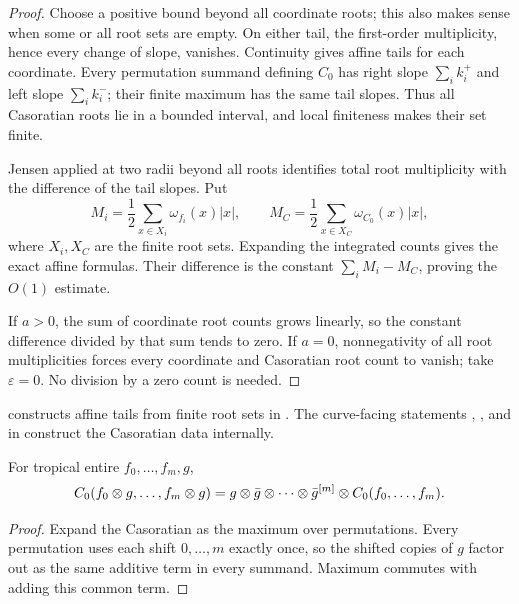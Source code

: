 \begin{proof}
\leanok
Choose a positive bound beyond all coordinate roots; this also makes sense
when some or all root sets are empty.  On either tail, the first-order
multiplicity, hence every change of slope, vanishes.  Continuity gives affine
tails for each coordinate.  Every permutation summand defining $C_0$ has
right slope $\sum_i k_i^+$ and left slope $\sum_i k_i^-$; their finite maximum
has the same tail slopes.  Thus all Casoratian roots lie in a bounded
interval, and local finiteness makes their set finite.

Jensen applied at two radii beyond all roots identifies total root
multiplicity with the difference of the tail slopes.  Put
\[
 M_i=\frac12\sum_{x\in X_i}\omega_{f_i}(x)|x|,\qquad
 M_C=\frac12\sum_{x\in X_C}\omega_{C_0}(x)|x|,
\]
where $X_i,X_C$ are the finite root sets.  Expanding the integrated counts
gives the exact affine formulas.  Their difference is the constant
$\sum_iM_i-M_C$, proving the $O(1)$ estimate.

If $a>0$, the sum of coordinate root counts grows linearly, so the constant
difference divided by that sum tends to zero.  If $a=0$, nonnegativity of all
root multiplicities forces every coordinate and Casoratian root count to
vanish; take $\varepsilon=0$.  No division by a zero count is needed.
\end{proof}

\begin{leanproof}
 constructs affine tails from
finite root sets in .
The curve-facing statements
,
, and
 in
 construct the Casoratian data internally.
\end{leanproof}

\begin{lemma}
\leanok
{}
For tropical entire $f_0,\ldots,f_m,g$,
\[
 C_0(f_0\mathbin{\otimes} g,\ldots,f_m\mathbin{\otimes} g)
 =g\mathbin{\otimes}\bar g\mathbin{\otimes}\cdots\mathbin{\otimes}\bar g^{[m]}
  \mathbin{\otimes} C_0(f_0,\ldots,f_m).
\]
\end{lemma}

\begin{proof}
\leanok
Expand the Casoratian as the maximum over permutations.  Every permutation
uses each shift $0,\ldots,m$ exactly once, so the shifted copies of $g$ factor
out as the same additive term in every summand.  Maximum commutes with adding
this common term.
\end{proof}

